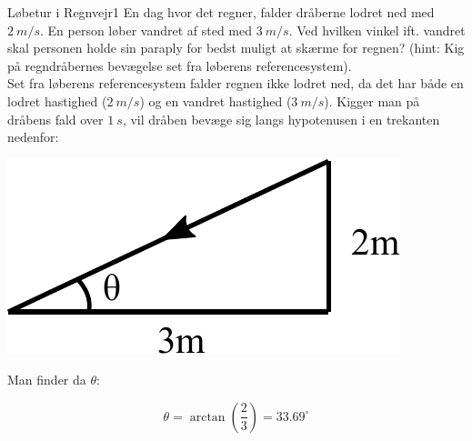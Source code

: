\begin{opgave}{Løbetur i Regnvejr}{1}
	En dag hvor det regner, falder dråberne lodret ned med $\SI{2}{m/s}$. En person løber vandret af sted med $\SI{3}{m/s}$. Ved hvilken vinkel ift. vandret skal personen holde sin paraply for bedst muligt at skærme for regnen? (hint: Kig på regndråbernes bevægelse set fra løberens referencesystem).\\
	
	Set fra løberens referencesystem falder regnen ikke lodret ned, da det har både en lodret hastighed ($\SI{2}{m/s}$) og en vandret hastighed ($\SI{3}{m/s}$). Kigger man på dråbens fald over $\SI{1}{s}$, vil dråben bevæge sig langs hypotenusen i en trekanten nedenfor:
	\begin{center}
	\includegraphics[scale=0.9]{Relativitetsteori/regn_fig.pdf}	
	\end{center}
	
	Man finder da $\theta$:
	
	$$\theta = \arctan \left( \frac{2}{3} \right) = 33.69^\circ$$	
\end{opgave}

